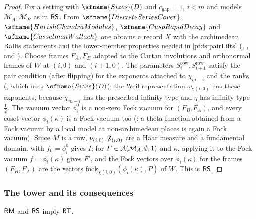 \begin{proof}
Fix a setting with $\sfname{Sizes}(D)$ and $c_{\mathrm{gap}}=1$, $i<m$ and models $\mathcal M_A,\mathcal M_B$ as in $\mathsf{RS}$. From
$\sfname{DiscreteSeriesCover}$, $\sfname{HarishChandraModules}$, $\sfname{CuspRapidDecay}$ and $\sfname{CasselmanWallach}$ one obtains
a record $X$ with the archimedean Rallis statements and the lower-member properties needed in \cref{pf:fs:pairLifts}
(, , and ).
Choose frames $F_A,F_B$ adapted to the Cartan involutions and orthonormal frames of $W$ at $(i,0)$ and $(i+1,0)$. The parameters
$S^{\mathrm{row}}_i,S^{\mathrm{row}}_{i+1}$ satisfy the pair condition (after flipping) for the exponents attached to $\chi_{m-i}$ and
the ranks (, which uses $\sfname{Sizes}(D)$); the Weil representation $\omega_{\chi(i,0)}$ has
these exponents, because $\chi_{m-i}$ has the prescribed infinity type and $\eta$ has infinity type $\frac12$. The vacuum vector
$\phi_i^0$ is a non-zero Fock vacuum for $(F_B,F_A)$, and every coset vector $\phi_i(\kappa)$ is a Fock vacuum too
(: a theta function obtained from a Fock vacuum by a local model at
non-archimedean places is again a Fock vacuum). Since $M$ is a row, $\nu_{(i,0)},\mathfrak F_{(i,0)}$ are a Haar measure and a fundamental
domain.  with $f_0=\phi_i^0$ gives $I$; for $F\in\mathcal A(\mathcal M_A;\emptyset,1)$ and $\kappa$, applying it to the
Fock vacuum $f=\phi_i(\kappa)$ gives $F'$, and the Fock vectors over $\phi_i(\kappa)$ for the frames $(F_B,F_A)$ are the vectors
$\mathrm{fock}_{\chi(i,0)}(\phi_i(\kappa),P)$ of $W$. This is $\mathsf{RS}$.
\end{proof}

\subsubsection{The tower and its consequences}

\begin{proposition}\label{pf:fs:tower}
$\mathsf{RM}$ and $\mathsf{RS}$ imply $\mathsf{RT}$.
\end{proposition}

